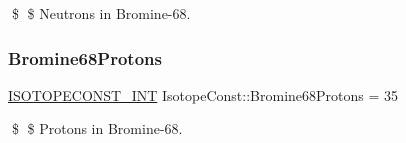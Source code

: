 \$ \$ Neutrons in Bromine-\/68. \mbox{\label{group___isotope_const-_bromine-_br68_gabb60321d5c155aa1b11bc4669b77de4e}} 
\subsubsection{\texorpdfstring{Bromine68\+Protons}{Bromine68Protons}}
{\footnotesize\ttfamily \mbox{\hyperlink{group___isotope_const-_macros_ga5f18360b3e99483a35c32d789e62621c}{I\+S\+O\+T\+O\+P\+E\+C\+O\+N\+S\+T\+\_\+\+I\+NT}} Isotope\+Const\+::\+Bromine68\+Protons = 35}

\$ \$ Protons in Bromine-\/68. 